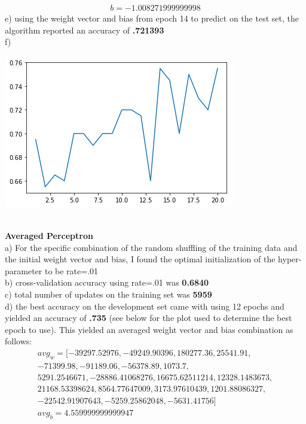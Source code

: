 \documentclass[11pt,a4paper]{article}
\begin{document}
\begin{enumerate}
\begin{gather}
			b = -1.008271999999998
			\end{gather}
			e) using the weight vector and bias from epoch 14 to predict on the test set, the algorithm reported an accuracy of \textbf{.721393} \\
			f)
			\begin{center}
				\includegraphics[width=0.7\linewidth]{margin_plot}
			\end{center}
			~\\
			\textbf{Averaged Perceptron}    \\
			a) For the specific combination of the random shuffling of the training data and the initial weight vector and bias, I found the optimal initialization of the hyper-parameter to be rate=.01  \\
			b) cross-validation accuracy using rate=.01 was \textbf{0.6840}\\
			c) total number of updates on the training set was \textbf{5959}\\
			d) the best accuracy on the development set came with using 12 epochs and yielded an accuracy of \textbf{.735} (see below for the plot used to determine the best epoch to use). This yielded an averaged weight vector and bias combination as follows:\\
			\begin{gather}
			avg_w = [-39297.52976   , -49249.90396   , 180277.36      ,  25541.91      ,\\
         -71399.98      , -91189.06      , -56378.89      ,   1073.7       ,\\
           5291.2546671 , -28886.41068276,  16675.62511214,  12328.1483673 ,\\
          21168.53398624,   8564.77647009,   3173.97610439,   1201.88086327,\\
         -22542.91907643,  -5259.25862048,  -5631.41756   ] \\
			avg_b = 4.559999999999947
			\end{gather}

\end{enumerate}
\end{document}
